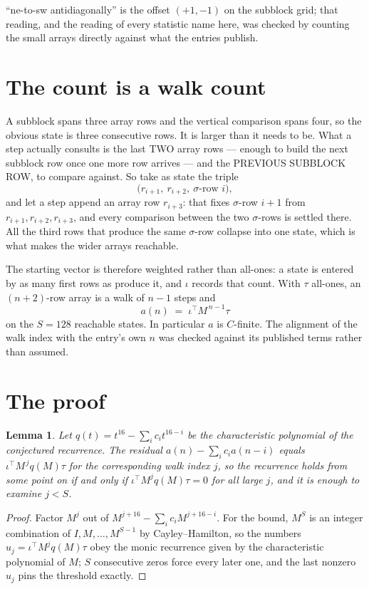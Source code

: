 \documentclass[11pt,a4paper]{article}
\theoremstyle{plain}
\newtheorem{lemma}[theorem]{Lemma}
\theoremstyle{definition}
\begin{document}
``ne-to-sw antidiagonally'' is the offset $(+1,-1)$ on the subblock grid; that reading, and
the reading of every statistic name here, was checked by counting the small arrays directly
against what the entries publish.

\section{The count is a walk count}

A subblock spans three array rows and the vertical comparison spans four, so the obvious state
is three consecutive rows. It is larger than it needs to be. What a step actually consults is
the last TWO array rows --- enough to build the next subblock row once one more row arrives ---
and the PREVIOUS SUBBLOCK ROW, to compare against. So take as state the triple
\[
\bigl(r_{i+1},\ r_{i+2},\ \sigma\text{-row }i\bigr),
\]
and let a step append an array row $r_{i+3}$: that fixes $\sigma$-row $i+1$ from
$r_{i+1},r_{i+2},r_{i+3}$, and every comparison between the two $\sigma$-rows is settled
there. All the third rows that produce the same $\sigma$-row collapse into one state, which is
what makes the wider arrays reachable.

The starting vector is therefore weighted rather than all-ones: a state is entered by as many
first rows as produce it, and $\iota$ records that count. With $\tau$ all-ones, an
$(n+2)$-row array is a walk of $n-1$ steps and
\[
a(n)\;=\;\iota^{\!\top}M^{\,n-1}\tau
\]
on the $S=128$ reachable states. In particular $a$ is $C$-finite. The alignment of the walk
index with the entry's own $n$ was checked against its published terms rather than assumed.

\section{The proof}

\begin{lemma}\label{lem:crit}
Let $q(t)=t^{16}-\sum_i c_it^{16-i}$ be the characteristic polynomial of the
conjectured recurrence. The residual $a(n)-\sum_ic_ia(n-i)$ equals
$\iota^{\!\top}M^{\,j}q(M)\tau$ for the corresponding walk index $j$, so the recurrence
holds from some point on if and only if $\iota^{\!\top}M^{j}q(M)\tau=0$ for all large $j$,
and it is enough to examine $j<S$.
\end{lemma}

\begin{proof}
Factor $M^{j}$ out of $M^{j+16}-\sum_ic_iM^{j+16-i}$. For the bound, $M^{S}$
is an integer combination of $I,M,\dots,M^{S-1}$ by Cayley--Hamilton, so the numbers
$u_j=\iota^{\!\top}M^{j}q(M)\tau$ obey the monic recurrence given by the characteristic
polynomial of $M$; $S$ consecutive zeros force every later one, and the last nonzero $u_j$
pins the threshold exactly.
\end{proof}
\end{document}
